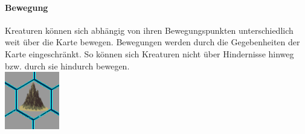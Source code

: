 \documentclass[a4paper,12pt]{scrartcl}
\begin{document}
	\paragraph{Bewegung}
	Kreaturen können sich abhängig von ihren Bewegungspunkten unterschiedlich weit über die Karte bewegen. 
	Bewegungen werden durch die Gegebenheiten der Karte eingeschränkt. So können sich Kreaturen nicht über Hindernisse hinweg bzw. durch sie hindurch bewegen.\\
	\includegraphics[width=\textwidth]{Prog2_EA_V2/screenshots/Hindernis.png}
	
\end{document}
